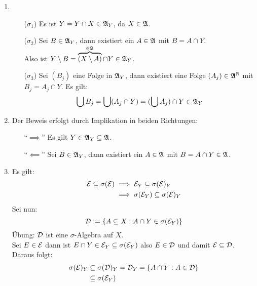 \begin{beweis}
    \begin{enumerate}
        \item 
          \begin{enumerate}
            \item[($\sigma_1$)] Es ist $Y=Y\cap X\in\mathfrak{A}_Y$, da $X\in\mathfrak{A}$.
            \item[($\sigma_2$)] Sei $B\in\mathfrak{A}_Y$, dann existiert ein 
                            $A\in\mathfrak{A}$ mit $B=A\cap Y$.\\
                            Also ist 
                            $Y\setminus B=\overbrace{(X\setminus A)}^{\in\mathfrak{A}} \cap Y\in\mathfrak{A}_Y$.
            \item[($\sigma_3$)] Sei $(B_j)$ eine Folge in $\mathfrak{A}_Y$, dann 
                            existiert eine Folge $(A_j)\in\mathfrak{A}^{\mathbb{N}}$ 
                            mit $B_j=A_j\cap Y$. Es gilt:
                            \[\bigcup B_j=\bigcup(A_j\cap Y)=(\bigcup A_j)\cap Y\in\mathfrak{A}_Y\]
            \end{enumerate}
        \item Der Beweis erfolgt durch Implikation in beiden Richtungen:
              \begin{enumerate}
                \item["`$\implies$"'] Es gilt $Y\in\mathfrak{A}_Y\subseteq\mathfrak{A}$.
                \item["`$\impliedby$"'] Sei $B\in\mathfrak{A}_Y$, dann existiert ein $A\in\mathfrak{A}$ mit $B=A\cap Y\in\mathfrak{A}$.
              \end{enumerate}
        \item Es gilt:
        \begin{align*}
        \mathcal{E}\subseteq\sigma(\mathcal{E})&\implies\mathcal{E}_Y\subseteq\sigma(\mathcal{E})_Y\\
        &\implies\sigma(\mathcal{E}_Y)\subseteq\sigma(\mathcal{E})_Y
        \end{align*}
        Sei nun:
        \[\mathcal{D}:=\{A\subseteq X:A\cap Y\in\sigma(\mathcal{E}_Y)\}\]
        Übung: $\mathcal{D}$ ist eine $\sigma$-Algebra auf $X$.\\
        Sei $E\in\mathcal{E}$ dann ist $E\cap Y\in\mathcal{E}_Y\subseteq\sigma(\mathcal{E}_Y)$ also $E\in\mathcal{D}$ und damit $\mathcal{E}\subseteq\mathcal{D}$. Daraus folgt:
        \begin{align*}
        \sigma(\mathcal{E})_Y&\subseteq\sigma(\mathcal{D})_Y=\mathcal{D}_Y=\{A\cap Y:A\in\mathcal{D}\}\\
        &\subseteq\sigma(\mathcal{E}_Y)
        \end{align*}
    \end{enumerate}
\end{beweis}

